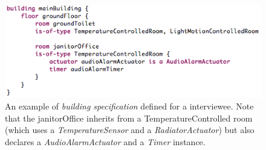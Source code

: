 \begin{figure}
  \centering
  \includegraphics[scale=.5]{dsl-building-definition.png}  
  \caption{An example of \textit{building specification} defined for a interviewee. Note that the janitorOffice inherits from a TemperatureControlled room (which uses a \textit{TemperatureSensor} and a \textit{RadiatorActuator}) but also declares a \textit{AudioAlarmActuator} and a \textit{Timer} instance.}
  \label{fig:dsl-building-definition}
\end{figure}

